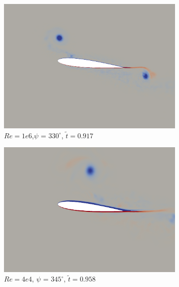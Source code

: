 \begin{figure}[H]
\begin{subfigure}[b]{0.32\textwidth}
		\includegraphics[width=1\textwidth]{figures/Vorticity_plots/Re_1m_1pt2/phase_330.png}
		\caption{$Re=1e6$,$\psi$ = $330^\circ$, $\tilde{t}=0.917$}
		\label{fig:Re_1m_1pt2_phi330}
	\end{subfigure}	
	\begin{subfigure}[b]{0.32\textwidth}
		\centering
		\includegraphics[width=1\textwidth]{figures/Vorticity_plots/Re_40k_1pt2/phase_345.png}
		\caption{$Re=4e4$, $\psi$ = $345^\circ$, $\tilde{t}=0.958$}
		\label{fig:Re_40k_1pt2_phi345}
	\end{subfigure}
	\begin{subfigure}[b]{0.32\textwidth}
		\centering

\end{subfigure}
\end{figure}
